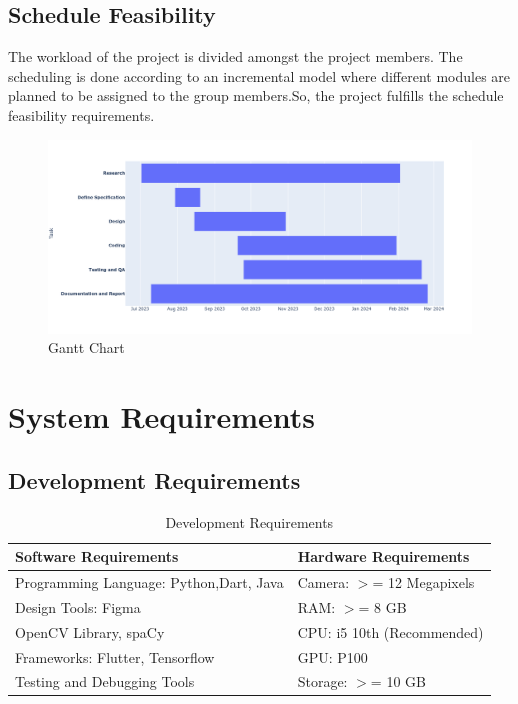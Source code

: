  \subsection{Schedule Feasibility}
 The workload of the project is divided amongst the project members. The scheduling is
 done according to an incremental model where different modules are planned to be
 assigned to the group members.So, the project fulfills the schedule feasibility
 requirements.
\begin{figure}[h]
    \centering
    \includegraphics[scale=0.35]{images/GanttChart.png}
    \caption{Gantt Chart}\label{fig:my_label}
\end{figure}
\section{System Requirements}

\subsection{Development Requirements}
\begin{table}[h]
    \centering
    \caption{Development Requirements}
    \begin{tabular}{|l|l|}
        \hline
        \textbf{Software Requirements} & \textbf{Hardware Requirements}\\ \hline
        Programming Language: Python,Dart, Java & Camera: \(>\)= 12 Megapixels\\ \hline
        Design Tools: Figma & RAM: \(>\)= 8 GB\\ \hline
        OpenCV Library, spaCy & CPU: i5 10th (Recommended)\\ \hline
        Frameworks: Flutter, Tensorflow & GPU: P100\\ \hline
        Testing and Debugging Tools & Storage: \(>\)= 10 GB\\ \hline
    \end{tabular}
\end{table}
\newpage
